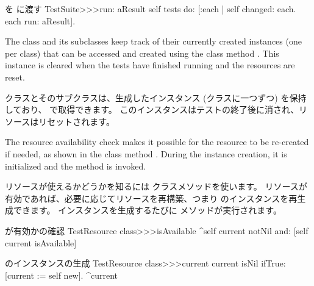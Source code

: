 \documentclass[a4paper,10pt,twoside]{book}
\begin{document}
{%
\begin{method}[testsuiterun:]{ を  に渡す}
TestSuite>>>run: aResult
	self tests do: [:each | 
		self changed: each.
		each run: aResult].
\end{method}

The class  and its subclasses keep track of
their currently created instances (one per class) that can be accessed
and created using the class method .  This instance is
cleared when the tests have finished running and the resources are
reset.
\fi

 クラスとそのサブクラスは、生成したインスタンス (クラスに一つずつ) を保持しており、  で取得できます。
このインスタンスはテストの終了後に消され、リソースはリセットされます。

The resource availability check makes it possible for the resource to be 
re-created if needed, as shown in the class method .  During the 
instance creation, it is initialized and the method  is
invoked.
\fi

リソースが使えるかどうかを知るには  クラスメソッドを使います。
リソースが有効であれば、必要に応じてリソースを再構築、つまり  のインスタンスを再生成できます。
インスタンスを生成するたびに  メソッドが実行されます。


\begin{method}[testresourceisavailable]{ が有効かの確認}
TestResource class>>>isAvailable
	^self current notNil and: [self current isAvailable]
\end{method}

\begin{method}[testresourcecurrent]{ のインスタンスの生成}
TestResource class>>>current
	current isNil ifTrue: [current := self new].
	^current
\end{method}

}
\end{document}
